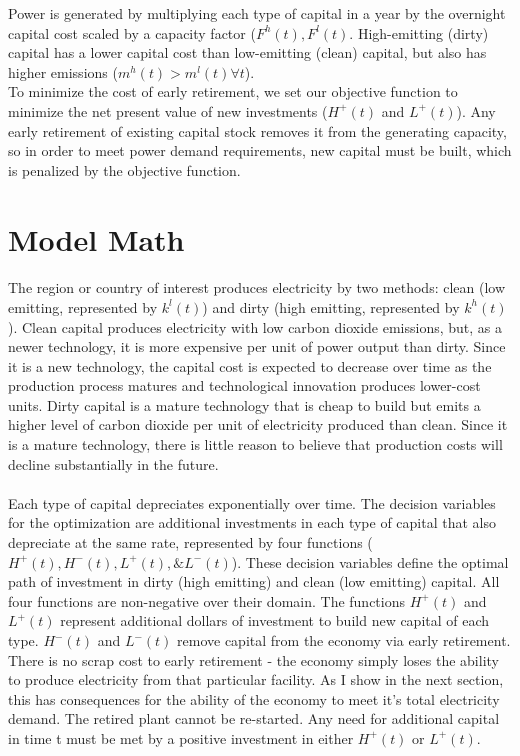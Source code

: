 \documentclass[singlespace]{easychithesis}
\begin{document}
Power is generated by multiplying each type of capital in a year by the overnight capital cost scaled by a capacity factor ($F^h(t), F^l(t)$. High-emitting (dirty) capital has a lower capital cost than low-emitting (clean) capital, but also has higher emissions ($m^h(t) > m^l(t) \forall t$). \\

To minimize the cost of early retirement, we set our objective function to minimize the net present value of new investments ($H^+(t)$ and $L^+(t)$). Any early retirement of existing capital stock removes it from the generating capacity, so in order to meet power demand requirements, new capital must be built, which is penalized by the objective function. 



\section{Model Math}

\paragraph{} The region or country of interest produces electricity by two methods: clean (low emitting, represented by $k^l(t)$) and dirty (high emitting, represented by $k^h(t)$). Clean capital produces electricity with low carbon dioxide emissions, but, as a newer technology, it is more expensive per unit of power output than dirty. Since it is a new technology, the capital cost is expected to decrease over time as the production process matures and technological innovation produces lower-cost units. Dirty capital is a mature technology that is cheap to build but emits a higher level of carbon dioxide per unit of electricity produced than clean. Since it is a mature technology, there is little reason to believe that production costs will decline substantially in the future. 


\paragraph{} Each type of capital depreciates exponentially over time. The decision variables for the optimization are additional investments in each type of capital that also depreciate at the same rate, represented by four functions ($H^+(t), H^-(t), L^+(t), \& L^-(t)$). These decision variables define the optimal path of investment in dirty (high emitting) and clean (low emitting) capital. All four functions are non-negative over their domain. The functions $H^+(t)$ and $L^+(t)$ represent additional dollars of investment to build new capital of each type. $H^-(t)$ and $L^-(t)$ remove capital from the economy via early retirement. There is no scrap cost to early retirement - the economy simply loses the ability to produce electricity from that particular facility. As I show in the next section, this has consequences for the ability of the economy to meet it's total electricity demand. The retired plant cannot be re-started. Any need for additional capital in time t must be met by a positive investment in either $H^+(t)$ or $L^+(t)$. 
\end{document}
